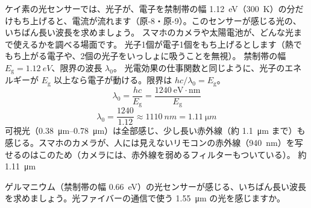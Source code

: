 \label{ph:原-2:ex6}
\begin{phreidai}[ケイ素の光センサーが感じる光]
ケイ素の光センサーでは、光子が、電子を禁制帯の幅 \qty{1.12}{eV}（\qty{300}{K}）の分だけもち上げると、電流が流れます（原-8・原-9）。このセンサーが感じる光の、いちばん長い波長を求めましょう。
\phbamen
スマホのカメラや太陽電池が、どんな光まで使えるかを調べる場面です。
\phmushi
光子1個が電子1個をもち上げるとします（熱でもち上がる電子や、2個の光子をいっしょに吸うことを無視）。
\phzu
禁制帯の幅 $E_{\mathrm g}=\qty{1.12}{eV}$、限界の波長 $\lambda_0$。
\phriyu
光電効果の仕事関数と同じように、光子のエネルギーが $E_{\mathrm g}$ 以上なら電子が動ける。限界は $hc/\lambda_0=E_{\mathrm g}$。
\phtateru
\[ \lambda_0=\frac{hc}{E_{\mathrm g}}=\frac{1240\ \mathrm{eV\cdot nm}}{E_{\mathrm g}} \]
\phtoku
\[ \lambda_0=\frac{1240}{1.12}\approx\qty{1110}{nm}=\qty{1.11}{\micro m} \]
\phtashikame
可視光（\qtyrange{0.38}{0.78}{\micro m}）は全部感じ、少し長い赤外線（約 \qty{1.1}{\micro m} まで）も感じる。スマホのカメラが、人には見えないリモコンの赤外線（\qty{940}{nm}）を写せるのはこのため（カメラには、赤外線を弱めるフィルターもついている）。
\kotae 約 \qty{1.11}{\micro m}
\end{phreidai}
\begin{jibun}
ゲルマニウム（禁制帯の幅 \qty{0.66}{eV}）の光センサーが感じる、いちばん長い波長を求めましょう。光ファイバーの通信で使う \qty{1.55}{\micro m} の光を感じますか。
\end{jibun}

